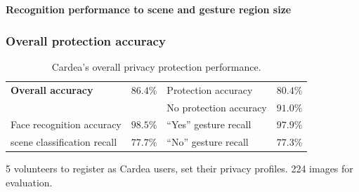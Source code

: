 \begin{frame}[t]
\begin{block}{\bf Recognition performance to scene and gesture region size}
\begin{figure}[!htbp]
{{    }
  }
\end{figure}
\end{block}

\end{frame}

\begin{frame}[t]
\frametitle{Overall protection accuracy}

\begin{table}[tb]
\centering
\caption{Cardea's overall privacy protection performance.}
\begin{tabular}{lr|lr}
\toprule
\textbf{Overall accuracy}   & $\mathbf{86.4\%}$ & Protection accuracy   & $80.4\%$  \\
                            &                   &  No protection accuracy& $91.0\%$ \\ \midrule
Face recognition accuracy   & $98.5\%$  & ``Yes'' gesture recall        & $97.9\%$  \\
scene classification recall & $77.7\%$  & ``No'' gesture recall     & $77.3\%$  \\ \bottomrule

\end{tabular}
\end{table}


{\scriptsize \color{blue} 5 volunteers to register as Cardea users, set their privacy profiles. 224 images for evaluation.}


\end{frame}

